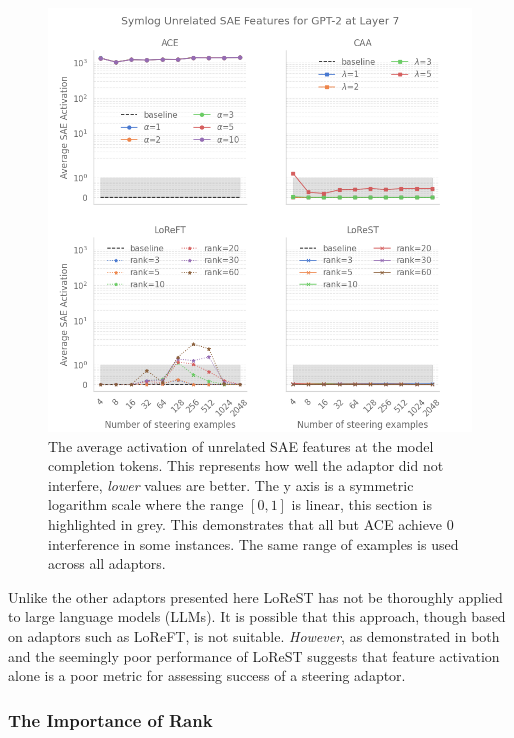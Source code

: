 \begin{figure}
    \centering
    \captionsetup{width=\textwidth}
    \includegraphics[width=\textwidth]{figures/gpt2_7_unrelated.png}
    \caption{
        The average activation of unrelated SAE features at the model completion tokens.
        This represents how well the adaptor did not interfere, \emph{lower} values are better.
        The y axis is a symmetric logarithm scale where the range $[0,1]$ is linear, this section is highlighted in grey.
        This demonstrates that all but ACE achieve 0 interference in some instances.
        The same range of examples is used across all adaptors.
    }
    \label{fig:gpt-pp-unrelated}
\end{figure}

Unlike the other adaptors presented here LoReST has not be thoroughly applied to large language models (LLMs).
It is possible that this approach, though based on adaptors such as LoReFT, is not suitable.
\emph{However}, as demonstrated in both  and  the seemingly poor performance of LoReST suggests that feature activation alone is a poor metric for assessing success of a steering adaptor.

\subsubsection{The Importance of Rank}
\label{sec:rank-res}

